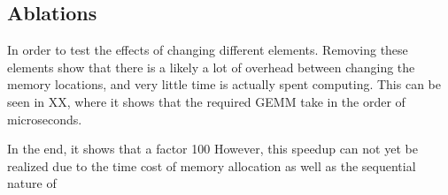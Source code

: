 \subsection{Ablations}
In order to test the effects of changing different elements. Removing these elements show that there is a likely a lot of overhead between changing the memory locations, and very little time is actually spent computing. This can be seen in XX, where it shows that the required GEMM take in the order of microseconds. 

In the end, it shows that a factor 100 However, this speedup can not yet be realized due to the time cost of memory allocation as well as the sequential nature of 